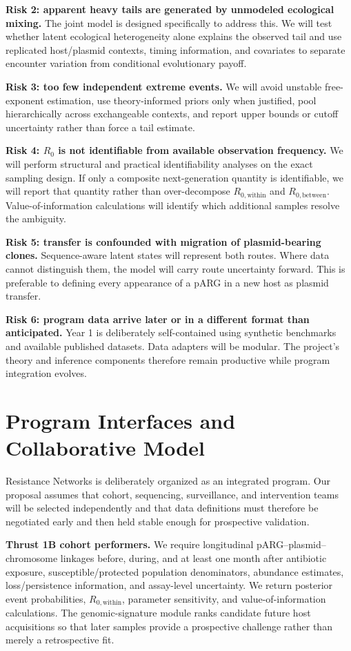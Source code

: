 \documentclass[12pt,a4paper]{article}
\newcommand{\Rwithin}{R_{0,\mathrm{within}}}
\newcommand{\Rbetween}{R_{0,\mathrm{between}}}
\begin{document}
\textbf{Risk 2: apparent heavy tails are generated by unmodeled ecological mixing.} The joint model is designed specifically to address this. We will test whether latent ecological heterogeneity alone explains the observed tail and use replicated host/plasmid contexts, timing information, and covariates to separate encounter variation from conditional evolutionary payoff.

\textbf{Risk 3: too few independent extreme events.} We will avoid unstable free-exponent estimation, use theory-informed priors only when justified, pool hierarchically across exchangeable contexts, and report upper bounds or cutoff uncertainty rather than force a tail estimate.

\textbf{Risk 4: $R_0$ is not identifiable from available observation frequency.} We will perform structural and practical identifiability analyses on the exact sampling design. If only a composite next-generation quantity is identifiable, we will report that quantity rather than over-decompose $\Rwithin$ and $\Rbetween$. Value-of-information calculations will identify which additional samples resolve the ambiguity.

\textbf{Risk 5: transfer is confounded with migration of plasmid-bearing clones.} Sequence-aware latent states will represent both routes. Where data cannot distinguish them, the model will carry route uncertainty forward. This is preferable to defining every appearance of a pARG in a new host as plasmid transfer.

\textbf{Risk 6: program data arrive later or in a different format than anticipated.} Year 1 is deliberately self-contained using synthetic benchmarks and available published datasets. Data adapters will be modular. The project's theory and inference components therefore remain productive while program integration evolves.

\section{Program Interfaces and Collaborative Model}\label{sec:interfaces}

Resistance Networks is deliberately organized as an integrated program. Our proposal assumes that cohort, sequencing, surveillance, and intervention teams will be selected independently and that data definitions must therefore be negotiated early and then held stable enough for prospective validation.

\textbf{Thrust 1B cohort performers.} We require longitudinal pARG--plasmid--chromosome linkages before, during, and at least one month after antibiotic exposure, susceptible/protected population denominators, abundance estimates, loss/persistence information, and assay-level uncertainty. We return posterior event probabilities, $\Rwithin$, parameter sensitivity, and value-of-information calculations. The genomic-signature module ranks candidate future host acquisitions so that later samples provide a prospective challenge rather than merely a retrospective fit.
\end{document}
